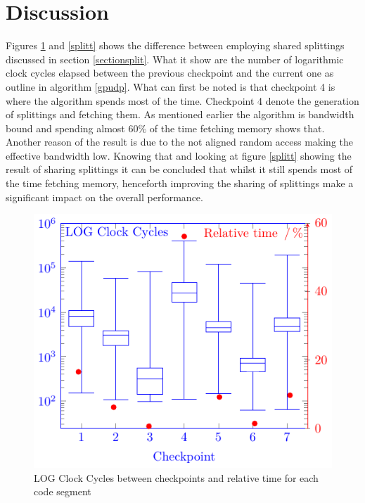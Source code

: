 \documentclass{llncs}
\begin{document}
\section{Discussion} %
Figures \ref{nosplitt} and \ref{splitt} shows the difference between employing 
shared splittings discussed in section \ref{sectionsplit}. 
What it show are the number of logarithmic clock cycles elapsed between the 
previous checkpoint and the current one as outline in algorithm \ref{gpudp}.
What can first be noted is that checkpoint 4 is where the algorithm spends most of the time. 
Checkpoint 4 denote the generation of splittings and fetching them.
As mentioned earlier the algorithm is bandwidth bound and spending almost
$60\%$ of the time fetching memory shows that. Another reason of the result
is due to the not aligned random access making the effective bandwidth low.
Knowing that and looking at figure \ref{splitt} showing the result of sharing splittings it can be concluded that whilst it still spends most 
of the time fetching memory, henceforth improving the sharing of splittings make a significant impact on the overall performance.
\begin{figure}[htbp]\centering
\includegraphics[width=0.8\columnwidth]{fig3cycles}
\caption{LOG Clock Cycles between checkpoints and relative time for each code segment\label{nosplitt}}
\end{figure}
\end{document}
